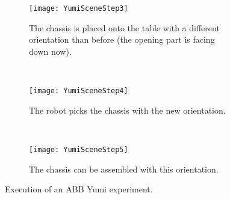 \begin{figure}[h]
\centering
        \begin{subfigure}[b]{1\columnwidth}
                \centering
                \texttt{[image: YumiSceneStep3]}
                \caption{The chassis is placed onto the table with a different orientation than before (the opening part is facing down now).}
                 \label{planning:SI.fig.Yumistep3}  
        \end{subfigure}   
        ~            
        \begin{subfigure}[b]{1\columnwidth}
                \centering
                \texttt{[image: YumiSceneStep4]}
                \caption{The robot picks the chassis with the new orientation. }
                 \label{planning:SI.fig.Yumistep4}  
        \end{subfigure} 
~

\centering

      \begin{subfigure}[b]{1\columnwidth}
                \centering
                \texttt{[image: YumiSceneStep5]}
                \caption{The chassis can be assembled with this orientation.}
                 \label{planning:SI.fig.Yumistep5}  
        \end{subfigure}         
                \label{planning:SI.fig.yumiscreen2}
                        \caption{Execution of an ABB Yumi experiment.}
\end{figure}
\clearpage
